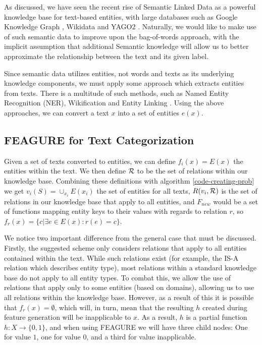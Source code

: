 \documentclass[twoside,11pt]{article}
\theoremstyle{definition}
\begin{document}
As discussed, we have seen the recent rise of Semantic Linked Data as a powerful knowledge base for text-based entities, with large databases such as Google Knowledge Graph \cite{pelikanova2014google}, Wikidata \cite{vrandevcic2014wikidata} and YAGO2 \cite{hoffart2013yago2}. Naturally, we would like to make use of such semantic data to improve upon the bag-of-words approach, with the implicit assumption that additional Semantic knowledge will allow us to better approximate the relationship between the text and its given label.

Since semantic data utilizes entities, not words and texts as its underlying knowledge components, we must apply some approach which extracts entities from texts. There is a multitude of such methods, such as Named Entity Recognition (NER),  Wikification \cite{bunescu2006using} and Entity Linking \cite{rao2013entity}.
Using the above approaches, we can convert a text $x$ into a set of entities $e(x)$.

\subsection{FEAGURE for Text Categorization}

Given a set of texts converted to entities, we can define $f_i(x)=E(x)$ the entities within the text. We then define ${\cal R}$ to be the set of relations within our knowledge base. Combining these definitions with algorithm \ref{code-creating-prob} we get $v_i(S)=\cup_{x_i}{E(x_i)}$ the set of entities for all texts, $R(v_i,{\cal R})$ is the set of relations in our knowledge base that apply to all entities, and $F_{new}$ would be a set of functions mapping entity keys to their values with regards to relation $r$, so $f_r(x)=\{c|\exists e\in E(x):r(e)=c\}$.

We notice two important difference from the general case that must be discussed.
Firstly, the suggested scheme only considers relations that apply to all entities contained within the text. While such relations exist (for example, the IS-A relation which describes entity type), most relations within a standard knowledge base do not apply to all entity types. To combat this, we allow the use of relations that apply only to some entities (based on domains), allowing us to use all relations within the knowledge base. However, as a result of this it is possible that $f_r(x)=\emptyset$, which will, in turn, mean that the resulting $h$ created during feature generation will be inapplicable to $x$. As a result, $h$ is a partial function $h:X\rightarrow \{0,1\}$, and when using FEAGURE we will have three child nodes: One for value $1$, one for value $0$, and a third for value inapplicable.
\end{document}
